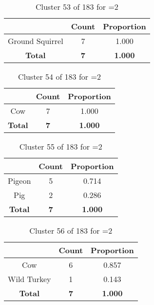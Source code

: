 \begin{table}[ht!]
\centering
\begin{tabular}{|c|c|c|}
\hline
\bf \Spec{} &\bf Count &\bf Proportion\\ \hline \hline
Ground Squirrel & 7 & 1.000\\ \hline
\hline
\bf Total & \bf 7 & \bf 1.000\\ \hline
\end{tabular}
\label{tab:cluster:53:2}
\caption{Cluster 53 of 183 for \minneigh{}=2}
\end{table}

\begin{table}[ht!]
\centering
\begin{tabular}{|c|c|c|}
\hline
\bf \Spec{} &\bf Count &\bf Proportion\\ \hline \hline
Cow & 7 & 1.000\\ \hline
\hline
\bf Total & \bf 7 & \bf 1.000\\ \hline
\end{tabular}
\label{tab:cluster:54:2}
\caption{Cluster 54 of 183 for \minneigh{}=2}
\end{table}

\begin{table}[ht!]
\centering
\begin{tabular}{|c|c|c|}
\hline
\bf \Spec{} &\bf Count &\bf Proportion\\ \hline \hline
Pigeon & 5 & 0.714\\ \hline
Pig & 2 & 0.286\\ \hline
\hline
\bf Total & \bf 7 & \bf 1.000\\ \hline
\end{tabular}
\label{tab:cluster:55:2}
\caption{Cluster 55 of 183 for \minneigh{}=2}
\end{table}

\begin{table}[ht!]
\centering
\begin{tabular}{|c|c|c|}
\hline
\bf \Spec{} &\bf Count &\bf Proportion\\ \hline \hline
Cow & 6 & 0.857\\ \hline
Wild Turkey & 1 & 0.143\\ \hline
\hline
\bf Total & \bf 7 & \bf 1.000\\ \hline
\end{tabular}
\label{tab:cluster:56:2}
\caption{Cluster 56 of 183 for \minneigh{}=2}
\end{table}

